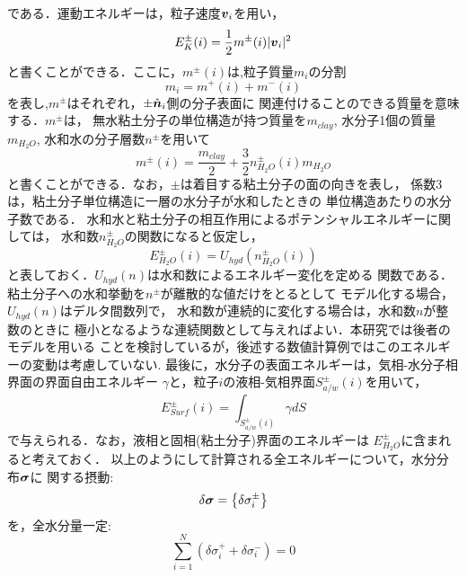 である．運動エネルギーは，粒子速度$\mbox{\boldmath $v$}_i$を用い，
\begin{equation}
	E_K^{\pm}(i)=\frac{1}{2}m^{\pm}(i) |\mbox{\boldmath $v$}_i|^2 
	\label{eqn:def_EK}
\end{equation}
と書くことができる．ここに，$m^\pm(i)$は,粒子質量$m_i$の分割
\begin{equation}
	m_i=m^+(i)+m^-(i)
	\label{eqn:mi_split}
\end{equation}
を表し,$m^{\pm}$はそれぞれ，$\pm\hat{\mbox{\boldmath $n$}}_i$側の分子表面に
関連付けることのできる質量を意味する．$m^\pm$は，
無水粘土分子の単位構造が持つ質量を$m_{clay}$, 
水分子1個の質量$m_{H_2O}$,
水和水の分子層数$n^{\pm}$を用いて
\begin{equation}
	m^{\pm}(i)=\frac{m_{clay}}{2}+\frac{3}{2}n_{H_2O}^{\pm}(i)m_{H_2O}
	\label{eqn:def_mpm}
\end{equation}
と書くことができる．なお，$\pm$は着目する粘土分子の面の向きを表し，
係数$3$は，粘土分子単位構造に一層の水分子が水和したときの
単位構造あたりの水分子数である．
水和水と粘土分子の相互作用によるポテンシャルエネルギーに関しては，
水和数$n^\pm_{H_2O}$の関数になると仮定し，
\begin{equation}
	E_{H_2O}^\pm(i)=U_{hyd}
	\left(
		n^\pm_{H_2O}(i)
	\right)
	\label{eqn:def_EH2O}
\end{equation}
と表しておく．$U_{hyd}(n)$は水和数によるエネルギー変化を定める
関数である．粘土分子への水和挙動を$n^\pm$が離散的な値だけをとるとして
モデル化する場合，$U_{hyd}(n)$はデルタ間数列で，
水和数が連続的に変化する場合は，水和数$n$が整数のときに
極小となるような連続関数として与えればよい．本研究では後者のモデルを用いる
ことを検討しているが，後述する数値計算例ではこのエネルギーの変動は考慮していない.
最後に，水分子の表面エネルギーは，気相-水分子相界面の界面自由エネルギー
$\gamma$と，粒子$i$の液相-気相界面$S^\pm_{a/w}(i)$を用いて，
\begin{equation}
	E_{Surf}^{\pm}(i)=\int_{S^\pm_{a/w}(i)}\gamma dS 
	\label{eqn:def_Esurf}
\end{equation}
で与えられる．なお，液相と固相(粘土分子)界面のエネルギーは
$E^\pm_{H_2O}$に含まれると考えておく．
以上のようにして計算される全エネルギーについて，水分分布$\mbox{\boldmath $\sigma$}$に
関する摂動:
\begin{equation}
	\delta \mbox{\boldmath $\sigma$}=\left\{ \delta \sigma^\pm_i \right\}
	\label{eqn:var_sig}
\end{equation}
を，全水分量一定:
\begin{equation}
	\sum_{i=1}^N \left( 
		\delta \sigma^+_i
		+
		\delta \sigma^-_i
	\right)
	=0
\end{equation}
